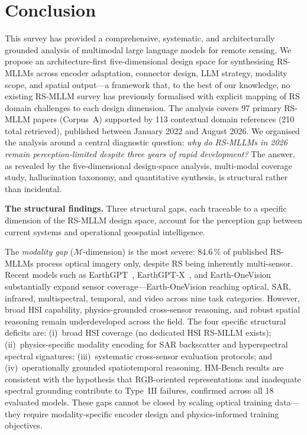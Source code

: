 
\section{Conclusion}\label{sec10}

This survey has provided a comprehensive, systematic, and architecturally
grounded analysis of multimodal large language models for remote sensing.
We propose an architecture-first five-dimensional design space for synthesising
RS-MLLMs across encoder adaptation, connector design, LLM strategy, modality scope,
and spatial output---a framework that, to the best of our knowledge, no existing
RS-MLLM survey has previously formalised with explicit mapping of RS domain
challenges to each design dimension. The analysis covers
97 primary RS-MLLM papers (Corpus~A) supported by 113 contextual
domain references (210 total retrieved), published between January 2022 and August 2026. We organised the
analysis around a central diagnostic question: \emph{why do RS-MLLMs in 2026 remain
perception-limited despite three years of rapid development?} The answer, as
revealed by the five-dimensional design-space analysis, multi-modal coverage study,
hallucination taxonomy, and quantitative synthesis, is structural rather than incidental.

\textbf{The structural findings.}
Three structural gaps, each traceable to a specific dimension of the RS-MLLM design
space, account for the perception gap between current systems and operational
geospatial intelligence.

The \emph{modality gap} ($\mathcal{M}$-dimension) is the most severe: 84.6\,\% of
published RS-MLLMs process optical imagery only, despite RS being inherently
multi-sensor. Recent models such as EarthGPT~\cite{earthgpt2025},
EarthGPT-X~\cite{earthgptx2026}, and Earth-OneVision~\cite{earthonevision2026}
substantially expand sensor coverage---Earth-OneVision reaching optical, SAR,
infrared, multispectral, temporal, and video across nine task categories.
However, broad HSI capability, physics-grounded cross-sensor reasoning, and
robust spatial reasoning remain underdeveloped across the field.
The four specific structural deficits are:
(i)~broad HSI coverage (no dedicated HSI RS-MLLM exists);
(ii)~physics-specific modality encoding for SAR backscatter and hyperspectral
spectral signatures;
(iii)~systematic cross-sensor evaluation protocols; and
(iv)~operationally grounded spatiotemporal reasoning.
HM-Bench results are consistent with the hypothesis that RGB-oriented
representations and inadequate spectral grounding contribute to Type~III failures,
confirmed across all 18 evaluated models. These gaps cannot be closed by scaling
optical training
data---they require modality-specific encoder design and physics-informed training
objectives.

